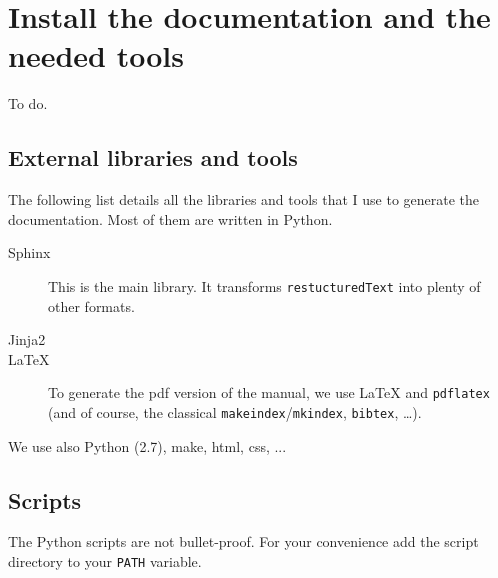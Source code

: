\documentclass[a4paper,10pt]{article}
\begin{document}
\section{Install the documentation and the needed tools}
\label{installation}

To do.

\subsection{External libraries and tools}

The following list details all the libraries and tools that I use to generate the documentation. Most of them are written in Python.

\begin{description}
 \item[Sphinx] This is the main library. It transforms \verb+restucturedText+ into plenty of other formats.
 \item[Jinja2] 
 \item[\LaTeX] To generate the pdf version of the manual, we use \LaTeX{} and \verb+pdflatex+ (and of course, the classical \verb+makeindex+/\verb+mkindex+, \verb+bibtex+, \ldots).
 \end{description}

We use also Python (2.7), make, html, css, ...

\subsection{Scripts}
The Python scripts are not bullet-proof. For your convenience add the script directory to your \verb+PATH+ variable.\\

% 
% 
\end{document}
